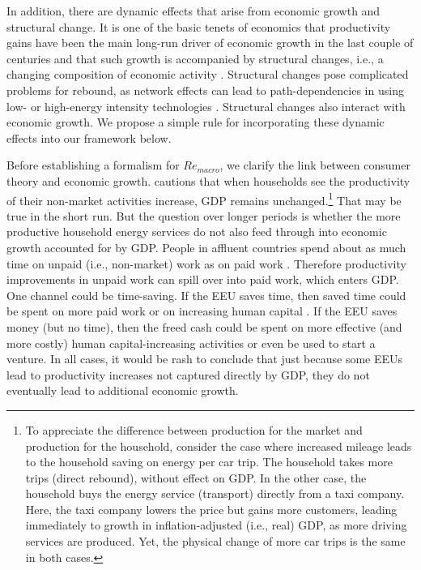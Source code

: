 \documentclass[12pt]{article}\usepackage[]{graphicx}\usepackage[]{xcolor}
\begin{document}
In addition, there are dynamic effects that arise from economic growth
and structural change.
It is one of the basic tenets of economics
that productivity gains have been the main long-run driver of economic growth
in the last couple of centuries \citep{Smith1776, Marx1867, Solow1957} and
that such growth is accompanied by structural changes, i.e., a changing
composition of economic activity \citep{Schumpeter1939, Kuznets1971}. 
Structural changes pose complicated problems for rebound, as
network effects can lead to path-dependencies in 
using low- or high-energy intensity technologies \citep{Arthur1989, Fouquet2016}.
Structural changes also interact with economic growth.
We propose a simple rule for incorporating 
these dynamic effects into our framework below.

Before establishing a formalism for $Re_{macro}$, we clarify the link between consumer theory
and economic growth. \citet{Turner:2013aa} cautions that when households
see the productivity of their non-market activities increase,
GDP remains unchanged.\footnote{
  To appreciate the difference between production for
  the market and production for the household, 
  consider the case
  where increased mileage leads to the household saving
  on energy per car trip. 
  The household takes more trips
  (direct rebound), without effect on GDP.
  In the other case, 
  the household buys the energy service
  (transport) directly from a taxi company. 
  Here, the taxi company lowers the price but gains more customers, 
  leading immediately to growth in inflation-adjusted (i.e., real) GDP,
  as more driving services are produced. 
  Yet, the physical change of more car trips is the same in both cases.
}
%
That may be true in the short run. But
the question over longer periods is whether the more productive
household energy services do not also feed through into economic
growth accounted for by GDP.
People in affluent countries spend about as much time on
unpaid (i.e., non-market) work as on paid work \citep{Folbre2021}.
Therefore productivity improvements in unpaid work can spill over
into paid work, which enters GDP.
One channel could be time-saving. 
If the EEU saves time,
then saved time could be spent on more paid work or
on increasing human capital \citep{Sorrell2008,Gautham2022}.
If the EEU saves money (but no time), 
then the freed cash could be spent on more effective 
(and more costly) human capital-increasing activities
or even be used to start a venture. 
In all cases, it would be rash to conclude that 
just because some EEUs lead to productivity increases
not captured directly by GDP,
they do not eventually lead to additional economic growth.
\end{document}

